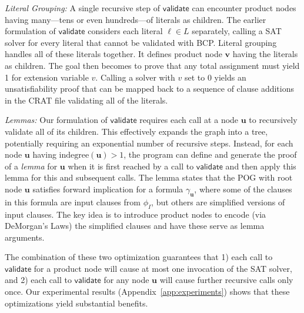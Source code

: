 \documentclass[letterpaper,USenglish,cleveref, autoref, thm-restate]{lipics-v2021}
\newcommand{\lit}{\ell}
\newcommand{\indegree}{\textrm{indegree}}
\newcommand{\validate}{\textsf{validate}}
\newcommand{\inputformula}{\phi_I}
\newcommand{\makenode}[1]{\mathbf{#1}}
\newcommand{\nodeu}{\makenode{u}}
\newcommand{\nodev}{\makenode{v}}
\begin{document}
{\em Literal Grouping:} A single recursive step of $\validate$ can encounter product nodes
having many---tens or even hundreds---of literals as children.  The
earlier formulation of $\validate$ considers each literal $\lit \in L$
separately, calling a SAT solver for every literal that cannot be
validated with BCP\@.  Literal grouping handles
all of these literals together.  It defines product node $\nodev$
having the literals as children.  The goal then becomes to prove that
any total assignment must yield 1 for extension variable $v$.  Calling
a solver with $v$ set to 0 yields an unsatisfiability proof that can
be mapped back to a sequence of clause additions in the CRAT file validating
all of the literals.

{\em Lemmas:} Our formulation of $\validate$ requires each call at a
node $\nodeu$ to recursively validate all of its children.  This
effectively expands the graph into a tree, potentially requiring an
exponential number of recursive steps.  Instead, for each node
$\nodeu$ having $\indegree(\nodeu) > 1$, the program can define and
generate the proof of a {\em lemma} for $\nodeu$ when it is first reached by
a call to $\validate$ and then apply this lemma for this and
subsequent calls.  The lemma states that the POG with root node
$\nodeu$ satisfies forward implication for a formula
$\gamma_{\nodeu}$, where some of the clauses in this formula are
input clauses from $\inputformula$, but others are simplified
versions of input clauses.
The key idea is to introduce product nodes to encode (via DeMorgan's
Laws) the simplified clauses and have these serve as lemma arguments.

The combination of these two optimization guarantees that 1) each call
to $\validate$ for a product node will cause at most one invocation of
the SAT solver, and 2) each call to $\validate$ for any node $\nodeu$
will cause further recursive calls only once.  Our experimental
results (Appendix~\ref{app:experiments}) shows that these
optimizations yield substantial benefits.



\end{document}

